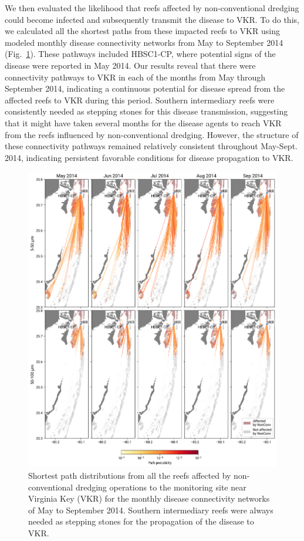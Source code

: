 \documentclass[preprint,12pt,authoryear]{elsarticle}
\begin{document}
We then evaluated the likelihood that reefs affected by non-conventional dredging could become infected and subsequently transmit the disease to VKR. To do this, we calculated all the shortest paths from these impacted reefs to VKR using modeled monthly disease connectivity networks from May to September 2014 (Fig.~\ref{fig:onset_path}). These pathways included HBSC1-CP, where potential signs of the disease were reported in May 2014. Our results reveal that there were connectivity pathways to VKR in each of the months from May through September 2014, indicating a continuous potential for disease spread from the affected reefs to VKR during this period. Southern intermediary reefs were consistently needed as stepping stones for this disease transmission, suggesting that it might have taken several months for the disease agents to reach VKR from the reefs influenced by non-conventional dredging. However, the structure of these connectivity pathways remained relatively consistent throughout May-Sept. 2014, indicating persistent favorable conditions for disease propagation to VKR.

\begin{figure}
	\centering
	\includegraphics[width=\textwidth]{figures/figure_new_shortest_paths.png}
    \caption{Shortest path distributions from all the reefs affected by non-conventional dredging operations to the monitoring site near Virginia Key (VKR) for the monthly disease connectivity networks of May to September 2014. Southern intermediary reefs were always needed as stepping stones for the propagation of the disease to VKR.}
	\label{fig:onset_path}
\end{figure}
\end{document}
